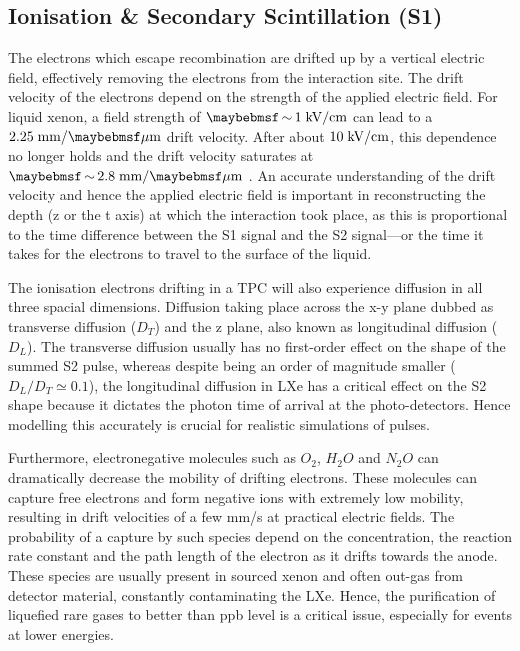 \subsection{Ionisation \& Secondary Scintillation (S1)}
\label{subsec:s2}

The electrons which escape recombination are drifted up by a vertical electric field, effectively removing the electrons from the interaction site. The drift velocity of the electrons depend on the strength of the applied electric field. For liquid xenon, a field strength of $\sim 1 \; \MathText{kV/cm}$ can lead to a $2.25 \; \MathText{mm/\mu{}m}$ drift velocity. After about $10 \; \text{kV/cm}$, this dependence no longer holds and the drift velocity saturates at $\sim2.8 \; \MathText{mm/\mu{}m}$ \cite{e_drift}. An accurate understanding of the drift velocity and hence the applied electric field is important in reconstructing the depth (z or the t axis) at which the interaction took place, as this is proportional to the time difference between the S1 signal and the S2 signal---or the time it takes for the electrons to travel to the surface of the liquid.

The ionisation electrons drifting in a TPC will also experience diffusion in all three spacial dimensions. Diffusion taking place across the x-y plane dubbed as transverse diffusion ($D_{T}$) and the z plane, also known as longitudinal diffusion ($D_{L}$). The transverse diffusion usually has no first-order effect on the shape of the summed S2 pulse, whereas despite being an order of magnitude smaller ($D_{L}/D_{T} \simeq 0.1$), the longitudinal diffusion in LXe has a critical effect on the S2 shape because it dictates the photon time of arrival at the photo-detectors. Hence modelling this accurately is crucial for realistic simulations of pulses.

Furthermore, electronegative molecules such as $O_{2}$, $H_{2}O$ and $N_{2}O$ can dramatically decrease the mobility of drifting electrons. These molecules can capture free electrons and form negative ions with extremely low mobility, resulting in drift velocities of a few mm/s at practical electric fields. The probability of a capture by such species depend on the concentration, the reaction rate constant and the path length of the electron as it drifts towards the anode. These species are usually present in sourced xenon and often out-gas from detector material, constantly contaminating the LXe. Hence, the purification of liquefied rare gases to better than ppb level is a critical issue, especially for events at lower energies.

